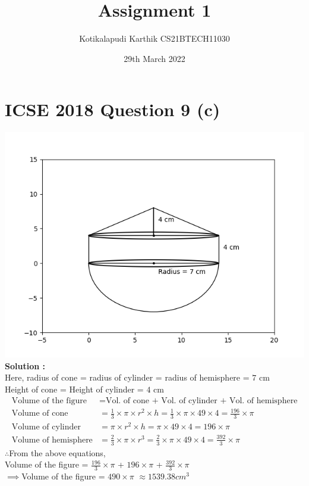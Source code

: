 \documentclass{article}
\title{Assignment 1}
\author{Kotikalapudi Karthik CS21BTECH11030}
\date{29th March 2022}
\begin{document}
\maketitle

\section*{ICSE 2018 Question 9 (c)}
\includegraphics[width=\columnwidth]{question9c.png}
\textbf{Solution :}\\
Here, radius of cone = radius of cylinder = radius of hemisphere = $7$ cm\\
Height of cone = Height of cylinder = $4$ cm
\begin{align}
    \text{Volume of the figure} &= \text{Vol. of cone + Vol. of cylinder + Vol. of hemisphere}
    \\
    \text{Volume of cone} &= \frac{1}{3} \times \pi \times r^2 \times h = \frac{1}{3} \times \pi \times 49 \times 4 = \frac{196}{3} \times \pi
    \\
    \text{Volume of cylinder} &= \pi \times r^2 \times h = \pi \times 49 \times 4 = 196 \times \pi
    \\
    \text{Volume of hemisphere} &= \frac{2}{3} \times \pi \times r^3 = \frac{2}{3} \times \pi \times 49 \times 4 = \frac{392}{3} \times \pi
\end{align}
$\therefore$From the above equations,\\
Volume of the figure = $\frac{196}{3} \times \pi$ + $196 \times \pi$ + $\frac{392}{3} \times \pi$\\
$\implies$Volume of the figure = $490 \times \pi$ $\approx 1539.38cm^3$
\end{document}
